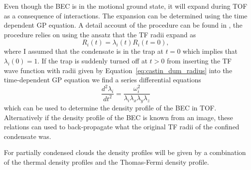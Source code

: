 Even though the BEC is in the motional ground state, it will expand during TOF as a consequence of interactions. The expansion can be determined using the time dependent GP equation. A detail account of the procedure can be found in \cite{castin_bose-einstein_1996}, the procedure relies on using the ansatz that the TF radii expand as
%
\begin{equation}
	R_i(t)=\lambda_i(t)R_i(t=0),
	\label{eq:castin_dum_radius}
\end{equation}
%
where I assumed that the condensate is in the trap at $t=0$ which implies that $\lambda_i(0)=1$. If the trap is suddenly turned off at $t>0$ from inserting the TF wave function with radii given by Equation~\ref{eq:castin_dum_radius} into the time-dependent GP equation we find a series differential equations
%
\begin{equation}
	\frac{d^2\lambda_i}{dt^2}=\frac{\omega_i^2}{\lambda_i\lambda_x\lambda_y\lambda_z}
\end{equation}
%
which can be used to determine the density profile of the BEC in TOF. Alternatively if the density profile of the BEC is known from an image, these relations can used to back-propagate what the original TF radii of the confined condensate was. 

For partially condensed clouds the density profiles will be given by a combination of the thermal density profiles and the Thomas-Fermi density profile. 








